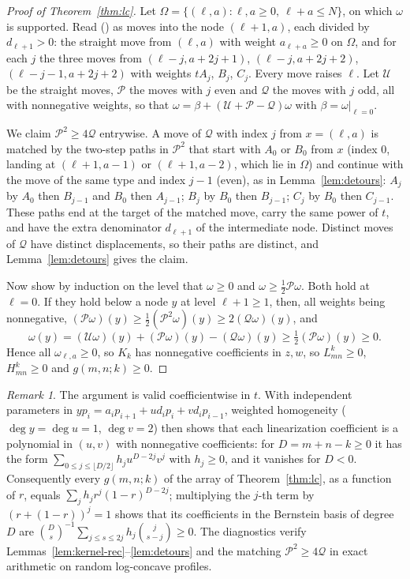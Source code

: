 \documentclass[twoside,10pt]{article}
\numberwithin{equation}{section}
\theoremstyle{slbody}
\theoremstyle{definition}
\theoremstyle{remark}
\newtheorem{remark}[theorem]{Remark}
\renewcommand{\eqref}[1]{\textup{{\normalfont(\oldstylenums{\ref{#1}}}\normalfont)}}
\begin{document}
\begin{proof}[Proof of Theorem~\ref{thm:lc}]
Let $\Omega=\{(\ell,a):\ell,a\geq0,\ \ell+a\leq N\}$, on which $\omega$ is supported. Read \eqref{eq:kernel-rec} as moves into the node $(\ell+1,a)$, each divided by $d_{\ell+1}>0$: the straight move from $(\ell,a)$ with weight $a_{\ell+a}\geq0$ on $\Omega$, and for each $j$ the three moves from $(\ell-j,a+2j+1)$, $(\ell-j,a+2j+2)$, $(\ell-j-1,a+2j+2)$ with weights $tA_j$, $B_j$, $C_j$. Every move raises $\ell$. Let $\mathcal U$ be the straight moves, $\mathcal P$ the moves with $j$ even and $\mathcal Q$ the moves with $j$ odd, all with nonnegative weights, so that $\omega=\beta+(\mathcal U+\mathcal P-\mathcal Q)\omega$ with $\beta=\omega|_{\ell=0}$.

We claim $\mathcal P^2\geq4\mathcal Q$ entrywise. A move of $\mathcal Q$ with index $j$ from $x=(\ell,a)$ is matched by the two-step paths in $\mathcal P^2$ that start with $A_0$ or $B_0$ from $x$ (index $0$, landing at $(\ell+1,a-1)$ or $(\ell+1,a-2)$, which lie in $\Omega$) and continue with the move of the same type and index $j-1$ (even), as in Lemma~\ref{lem:detours}: $A_j$ by $A_0$ then $B_{j-1}$ and $B_0$ then $A_{j-1}$; $B_j$ by $B_0$ then $B_{j-1}$; $C_j$ by $B_0$ then $C_{j-1}$. These paths end at the target of the matched move, carry the same power of $t$, and have the extra denominator $d_{\ell+1}$ of the intermediate node. Distinct moves of $\mathcal Q$ have distinct displacements, so their paths are distinct, and Lemma~\ref{lem:detours} gives the claim.

Now show by induction on the level that $\omega\geq0$ and $\omega\geq\frac12\mathcal P\omega$. Both hold at $\ell=0$. If they hold below a node $y$ at level $\ell+1\geq1$, then, all weights being nonnegative, $(\mathcal P\omega)(y)\geq\frac12(\mathcal P^2\omega)(y)\geq2(\mathcal Q\omega)(y)$, and
\[
\omega(y)=(\mathcal U\omega)(y)+(\mathcal P\omega)(y)-(\mathcal Q\omega)(y)\geq\tfrac12(\mathcal P\omega)(y)\geq0.
\]
Hence all $\omega_{\ell,a}\geq0$, so $K_k$ has nonnegative coefficients in $z,w$, so $L_{mn}^k\geq0$, $H_{mn}^k\geq0$ and $g(m,n;k)\geq0$.
\end{proof}

\begin{remark}
The argument is valid coefficientwise in $t$. With independent parameters in $yp_i=a_ip_{i+1}+ud_ip_i+vd_ip_{i-1}$, weighted homogeneity ($\deg y=\deg u=1$, $\deg v=2$) then shows that each linearization coefficient is a polynomial in $(u,v)$ with nonnegative coefficients: for $D=m+n-k\geq0$ it has the form $\sum_{0\leq j\leq\lfloor D/2\rfloor}h_ju^{D-2j}v^j$ with $h_j\geq0$, and it vanishes for $D<0$. Consequently every $g(m,n;k)$ of the array of Theorem~\ref{thm:lc}, as a function of $r$, equals $\sum_jh_jr^j(1-r)^{D-2j}$; multiplying the $j$-th term by $(r+(1-r))^j=1$ shows that its coefficients in the Bernstein basis of degree $D$ are $\binom Ds^{-1}\sum_{j\leq s\leq2j}h_j\binom j{s-j}\geq0$. The diagnostics  verify Lemmas~\ref{lem:kernel-rec}--\ref{lem:detours} and the matching $\mathcal P^2\geq4\mathcal Q$ in exact arithmetic on random log-concave profiles.
\end{remark}
\end{document}
